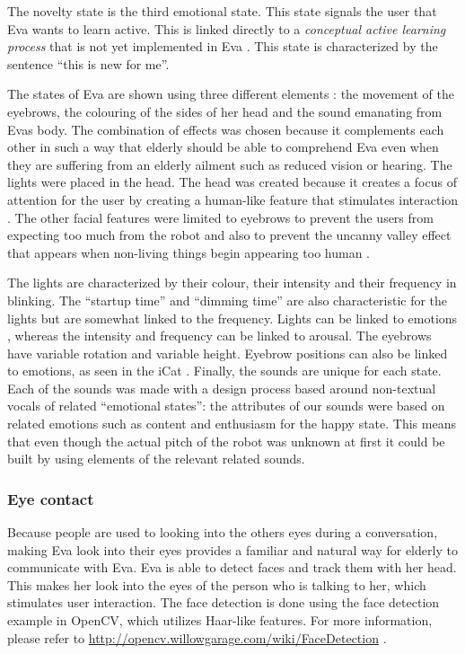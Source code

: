 \documentclass[project_eva.tex]{subfiles}
\begin{document}
The novelty state is the third emotional state. This state signals the user that Eva wants to learn active. This is 
linked 
directly to a \textit{conceptual active learning process} that is not yet implemented in Eva \pageref{sec:Concept}. This 
state is characterized by the sentence ``this is new for me''.

The states of Eva are shown using three different elements \cite{Tech}: the movement of the eyebrows, the colouring of the sides of her head  and the sound emanating from Eva\textquote s body. The combination of effects was chosen because it complements each other in such a way that elderly should be able to comprehend Eva even when they are suffering from an elderly ailment such as reduced vision or hearing. The lights were placed in the head. The head was 
created because it creates a focus of attention for the user by creating a human-like feature that stimulates interaction 
\cite{elderly}. The other facial features were limited to eyebrows to prevent the users from expecting too much from the 
robot and also to prevent the uncanny valley effect that appears when non-living things begin appearing too human 
\cite{uncanny}. 

The lights are characterized by their colour, their intensity and their frequency in blinking. The ``startup time'' and 
``dimming time'' are also characteristic for the lights but are somewhat linked to the frequency. Lights can be linked to 
emotions \cite{colour-emotion} , whereas the intensity and frequency can be linked to arousal. The eyebrows have variable 
rotation and variable height. Eyebrow positions can also be linked to emotions, as seen in the iCat \cite{iCat}. Finally, 
the sounds are unique for each state. Each of the sounds was made with a design process based around non-textual vocals 
of related ``emotional states'': the attributes of our sounds were based on related emotions  such as content and 
enthusiasm for the happy state. This means that even though the actual pitch of the robot was unknown at first it could 
be built by using elements \cite{sounds} of the relevant related sounds.

\subsubsection*{Eye contact}
Because people are used to looking into the other\textquotesingle s eyes during a conversation, making Eva look into 
their eyes provides a familiar and natural way for elderly to communicate with Eva. Eva is able to detect faces and 
track them with her head. This makes her look into the eyes of the person who is talking to her, which stimulates user 
interaction. The face detection is done using the face detection example in OpenCV, which utilizes Haar-like features. 
For more information, please refer to \url{http://opencv.willowgarage.com/wiki/FaceDetection} \cite{FaceDetection} .
\end{document}
